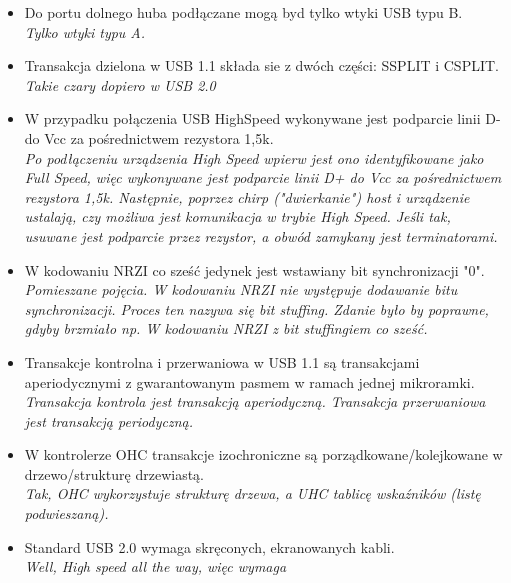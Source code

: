 \documentclass[a4paper,twoside]{article}
\begin{document}
\begin{itemize}
	\item \textcolor{nie}{Do portu dolnego huba podłączane mogą byd tylko wtyki USB typu B.} \\
	{\small \emph{Tylko wtyki typu A.}}
	
	\item \textcolor{nie}{Transakcja dzielona w USB 1.1 składa sie z dwóch części: SSPLIT i CSPLIT.} \\
	{\small \emph{Takie czary dopiero w USB 2.0}}
	
	\item \textcolor{nie}{W przypadku połączenia USB HighSpeed wykonywane jest podparcie linii D- do Vcc za pośrednictwem rezystora 1,5k.} \\
	{\small \emph{Po podłączeniu urządzenia High Speed wpierw jest ono identyfikowane jako Full Speed, więc wykonywane jest podparcie linii D+ do Vcc za pośrednictwem rezystora 1,5k. Następnie, poprzez chirp ("dwierkanie") host i urządzenie ustalają, czy możliwa jest komunikacja w trybie High Speed. Jeśli tak, usuwane jest podparcie przez rezystor, a obwód zamykany jest terminatorami.}}
	
	\item \textcolor{nie}{W kodowaniu NRZI co sześć jedynek jest wstawiany bit synchronizacji "0".} \\
	{\small \emph{Pomieszane pojęcia. W kodowaniu NRZI nie występuje dodawanie bitu synchronizacji. Proces ten nazywa się bit stuffing. Zdanie było by poprawne, gdyby brzmiało np. W kodowaniu NRZI z bit stuffingiem co sześć.}}
	
	\item \textcolor{nie}{Transakcje kontrolna i przerwaniowa w USB 1.1 są transakcjami aperiodycznymi z gwarantowanym pasmem w ramach jednej mikroramki.} \\
	{\small \emph{Transakcja kontrola jest transakcją aperiodyczną. Transakcja przerwaniowa jest transakcją periodyczną.}}
	
	\item \textcolor{tak}{W kontrolerze OHC transakcje izochroniczne są porządkowane/kolejkowane w drzewo/strukturę drzewiastą.} \\
	{\small \emph{Tak, OHC wykorzystuje strukturę drzewa, a UHC tablicę wskaźników (listę podwieszaną).}}
	
	\item \textcolor{tak}{Standard USB 2.0 wymaga skręconych, ekranowanych kabli.} \\
	{\small \emph{Well, High speed all the way, więc wymaga}}
	

\end{itemize}
\end{document}
